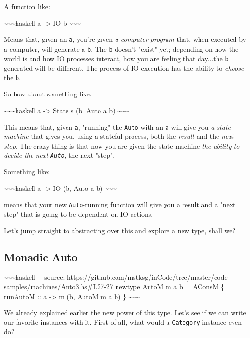 \documentclass[]{article}
\begin{document}
A function like:

\textasciitilde{}\textasciitilde{}\textasciitilde{}haskell a -\textgreater{} IO
b \textasciitilde{}\textasciitilde{}\textasciitilde{}

Means that, given an \texttt{a}, you're given \emph{a computer program} that,
when executed by a computer, will generate a \texttt{b}. The \texttt{b} doesn't
"exist" yet; depending on how the world is and how IO processes interact, how
you are feeling that day...the \texttt{b} generated will be different. The
process of IO execution has the ability to \emph{choose} the \texttt{b}.

So how about something like:

\textasciitilde{}\textasciitilde{}\textasciitilde{}haskell a -\textgreater{}
State s (b, Auto a b) \textasciitilde{}\textasciitilde{}\textasciitilde{}

This means that, given \texttt{a}, "running" the \texttt{Auto} with an
\texttt{a} will give you \emph{a state machine} that gives you, using a stateful
process, both the \emph{result} and the \emph{next step}. The crazy thing is
that now you are given the state machine \emph{the ability to decide the next
\texttt{Auto}}, the next "step".

Something like:

\textasciitilde{}\textasciitilde{}\textasciitilde{}haskell a -\textgreater{} IO
(b, Auto a b) \textasciitilde{}\textasciitilde{}\textasciitilde{}

means that your new \texttt{Auto}-running function will give you a result and a
"next step" that is going to be dependent on IO actions.

Let's jump straight to abstracting over this and explore a new type, shall we?

\subsection{Monadic Auto}

\textasciitilde{}\textasciitilde{}\textasciitilde{}haskell -\/- source:
https://github.com/mstksg/inCode/tree/master/code-samples/machines/Auto3.hs\#L27-27
newtype AutoM m a b = AConsM \{ runAutoM :: a -\textgreater{} m (b, AutoM m a b)
\} \textasciitilde{}\textasciitilde{}\textasciitilde{}

We already explained earlier the new power of this type. Let's see if we can
write our favorite instances with it. First of all, what would a
\texttt{Category} instance even do?
\end{document}
